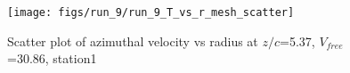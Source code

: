\begin{figure}[H]
\centering
\texttt{[image: figs/run\_9/run\_9\_T\_vs\_r\_mesh\_scatter]}
\caption{Scatter plot of azimuthal velocity vs radius at $z/c$=5.37, $V_{free}$=30.86, station1}
\label{fig:run_9_T_vs_r_mesh_scatter}
\end{figure}


